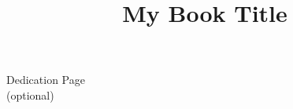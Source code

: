 \documentclass{ws-book975x65}
\title{My Book Title}              %
\begin{document}
\titlepages                        %

\begin{dedication}
\large Dedication Page \\[13pt]    %
\large (optional)
\end{dedication}




\tableofcontents



\setcounter{page}{1}













\printindex
\end{document}
